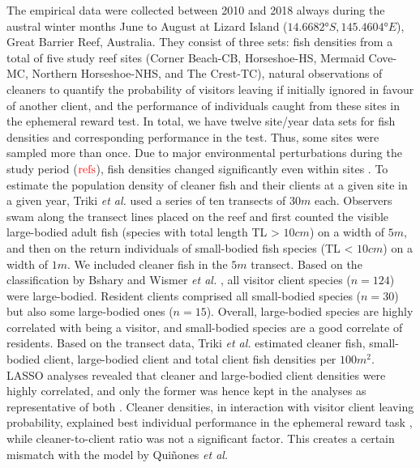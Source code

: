 \documentclass[]{rsos}%
\begin{document}
The empirical data were collected between 2010 and 2018 always during
the austral winter months June to August at Lizard Island
(\(14.6682° S, 145.4604° E\)), Great Barrier Reef, Australia.
They consist of three sets: fish densities from a total of five study
reef sites (Corner Beach-CB, Horseshoe-HS,
Mermaid Cove-MC, Northern Horseshoe-NHS, and The Crest-TC),
natural observations of cleaners to quantify the probability
of visitors leaving if initially ignored in favour of another client, and the
performance of individuals caught from these sites in the ephemeral reward test.
In total, we have twelve site/year data sets for fish densities and
corresponding performance in the test. Thus, some sites were sampled more
than once. Due to major environmental perturbations during the study period
(\(\color{red}{\text{refs}}\)), fish densities changed significantly even
within sites \citep{triki_Decrease_2018, triki_Fluctuations_2019}. To estimate
the population density of cleaner fish and their clients at a given site in
a given year, Triki \emph{et al.} \citep{triki_Biological_2019} used a series of ten
transects of \(30m\) each. Observers swam along the transect lines placed on
the reef and first counted the visible large-bodied adult fish
(species with total length TL \textgreater{} \(10cm\)) on a width of \(5m\), and then on the
return individuals of small-bodied fish species (TL \textless{} \(10 cm\)) on a width
of \(1 m\). We included cleaner fish in the \(5 m\) transect. Based on the
classification by Bshary \citep{bshary_Cleaner_2001a} and Wismer \emph{et al.}
\citep{wismer_Variation_2014}, all visitor client species (\(n = 124\)) were
large-bodied. Resident clients comprised all small-bodied species
(\(n = 30\)) but also some large-bodied ones (\(n = 15\)). Overall,
large-bodied species are highly correlated with being a visitor,
and small-bodied species are a good correlate of residents. Based on the
transect data, Triki \emph{et al.} \citep{triki_Biological_2019, triki_Brain_2020}
estimated cleaner fish, small-bodied client, large-bodied client and total
client fish densities per \(100 m^2\). LASSO analyses revealed that cleaner and
large-bodied client densities were highly correlated, and only the former
was hence kept in the analyses as representative of both \citep{triki_Biological_2019}.
Cleaner densities, in interaction with visitor client leaving probability,
explained best individual performance in the ephemeral reward task
\citep{triki_Biological_2019}, while cleaner-to-client ratio was not a significant
factor. This creates a certain mismatch with the model by Quiñones \emph{et al.}
\end{document}
